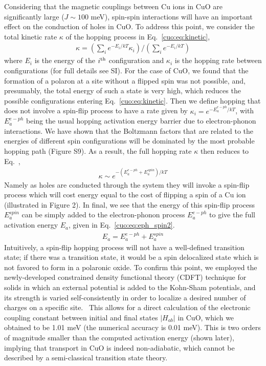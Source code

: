 Considering that the magnetic couplings between Cu ions in CuO are significantly large ($J\sim 100$ meV), spin-spin interactions will have an important effect on the conduction of holes in CuO. To address this point, we consider the total kinetic rate $\kappa$ of the hopping process in Eq.~\ref{cuo:eq:kinetic},
\begin{align}
    \kappa = \left( \sum_i e^{-E_i/kT} \kappa_i \right) / \left( \sum_i e^{-E_i/kT} \right)
    \label{cuo:eq:kinetic}
\end{align}
where $E_i$ is the energy of the $i^{\rm th}$ configuration and $\kappa_i$ is the hopping rate between configurations (for full details see SI). For the case of CuO, we found that the formation of a polaron at a site without a flipped spin was not possible, and, presumably, the total energy of such a state is very high, which reduces the possible configurations entering Eq.~\ref{cuo:eq:kinetic}. Then we define hopping that does not involve a spin-flip process to have a rate given by $\kappa_i=e^{-E_a^{e-ph}/kT}$, with $E_a^{e-ph}$ being the usual hopping activation energy barrier due to electron-phonon interactions. We have shown that the Boltzmann factors that are related to the energies of different spin configurations will be dominated by the most probable hopping path (Figure S9). As a result, the full hopping rate $\kappa$ then reduces to Eq.~\cite{cuo:eq:eph_spin},
\begin{align}
    \kappa \sim e^{-(E_a^{e-ph}+E_a^{spin})/kT}
    \label{cuo:eq:eph_spin}
\end{align}
Namely as holes are conducted through the system they will invoke a spin-flip process which will cost energy equal to the cost of flipping a spin of a Cu ion (illustrated in Figure 2). In final, we see that the energy of this spin-flip process $E_a^{spin}$ can be simply added to the electron-phonon process $E_a^{e-ph}$ to give the full activation energy $E_a$, given in Eq.~\ref{cuo:eq:eph_spin2}.
\begin{align}
    E_a = E_a^{e-ph}+E_a^{spin}
    \label{cuo:eq:eph_spin2}
\end{align}
Intuitively, a spin-flip hopping process will not have a well-defined transition state; if there was a transition state, it would be a spin delocalized state which is not favored to form in a polaronic oxide. To confirm this point, we employed the newly-developed constrained density functional theory (CDFT) technique for solids in which an external potential is added to the Kohn-Sham potentials, and its strength is varied self-consistently in order to localize a desired number of charges on a specific site.~\cite{goldey2017charge,kaduk2012constrained} This allows for a direct calculation of the electronic coupling constant between initial and final states $|H_{ab}|$ in CuO, which we obtained to be 1.01 meV (the numerical accuracy is 0.01 meV). This is two orders of magnitude smaller than the computed activation energy (shown later), implying that transport in CuO is indeed non-adiabatic, which cannot be described by a semi-classical transition state theory.

